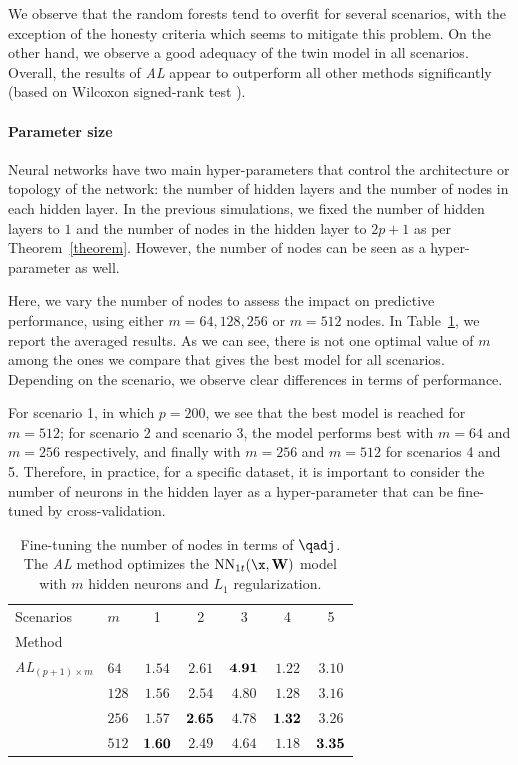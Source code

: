 We observe that the random forests tend to overfit for several scenarios, with the exception of the honesty criteria which seems to mitigate this problem. On the other hand, we observe a good adequacy of the twin model in all scenarios. Overall, the results of {\it AL} appear to outperform all other methods significantly (based on  Wilcoxon signed-rank test \citep{wilcoxon1992individual}).

\paragraph{Parameter size}
{}
Neural networks have two main hyper-parameters that control the architecture or topology of the network: the number of hidden layers and the number of nodes in each hidden layer. In the previous simulations, we fixed the number of hidden layers to $1$ and the number of nodes in the hidden layer to $2p+1$ as per Theorem~\ref{theorem}. However, the number of nodes can be seen as a hyper-parameter as well. 

Here, we vary the number of nodes to assess the impact on predictive performance, using either $m=64, 128, 256$ or $m=512$ nodes.  In Table~\ref{tab:hidden_neurons_results}, we report the averaged results. As we can see, there is not one optimal value of $m$ among the ones we compare that gives the best model for all scenarios. Depending on the scenario, we observe clear differences in terms of performance. 

For scenario 1, in which $p = 200$, we see that the best model is reached for $m = 512$; for scenario 2 and scenario 3, the model performs best with $m = 64$ and $m = 256$ respectively, and finally with $m = 256$ and $m = 512$ for scenarios 4 and 5. Therefore, in practice, for a specific dataset, it is important to consider the number of neurons in the hidden layer as a hyper-parameter that can be fine-tuned by cross-validation.

\begin{table}[!ht]
    \centering
    \caption{Fine-tuning the number of nodes in terms of $\qadj$. The {\it AL} method optimizes the $\mathrm{NN}_{1t}(\x, \mathbf{W})$ model with $m$ hidden neurons and $L_1$ regularization.}
    \label{tab:hidden_neurons_results}
    \begin{tabular}{l|l|ccccc}
        Scenarios &$m$ & 1 & 2 & 3 & 4 & 5\\
        Method &&&&&&\\
        \hline
        {\it AL$_{(p+1)\times m}$} 
        & $64$ & $1.54$  & $2.61$ & $\bf 4.91$ & $1.22$ & $3.10$ \\
        & $128$ & $1.56$  & $2.54$ & $4.80$ & $1.28$ & $3.16$\\
        & $256$ & $1.57$ & $\bf 2.65$ & $4.78$ & $\bf 1.32$ & $3.26$ \\
        & $512$ & $\bf 1.60$ & $2.49$ & $4.64$ & $1.18$ & $\bf 3.35$\\
               \hline
    \end{tabular}
\end{table}

